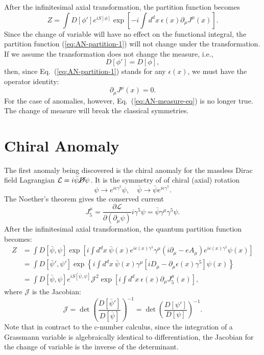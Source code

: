 After the infinitesimal axial transformation, the partition function becomes
\begin{equation}\label{eq:AN-partition-1}
	Z = \int D[\phi'] e^{iS[\phi]} \exp\left[-i\int d^d x \ \epsilon(x) \partial_\mu J^\mu (x)\right].
\end{equation}
Since the change of variable will have no effect on the functional integral, the partition function (\ref{eq:AN-partition-1}) will not change under the transformation.
If we assume the transformation does not change the measure, i.e.,
\begin{equation}\label{eq:AN-measure-eq}
	D[\phi'] = D[\phi],
\end{equation}
then, since Eq.~(\ref{eq:AN-partition-1}) stands for any $\epsilon(x)$, we must have the operator identity:
\begin{equation}
	\partial_\mu J^\mu(x) = 0.
\end{equation}
For the case of anomalies, however, Eq.~(\ref{eq:AN-measure-eq}) is no longer true.
The change of measure will break the classical symmetries.


\section{Chiral Anomaly}
The first anomaly being discovered is the chiral anomaly for the massless Dirac field Lagrangian $\mathcal L = i\bar\psi \cancel D \psi$.
It is the symmetry of of chiral (axial) rotation 
\begin{equation}
	\psi \rightarrow e^{i\epsilon \gamma^5}\psi, \quad
	\bar\psi \rightarrow \bar\psi e^{i\epsilon \gamma^5}.
\end{equation}
The Noether's theorem gives the conserved current
\begin{equation}
	J^\mu_5 = \frac{\partial \mathcal L}{\partial(\partial_\mu \psi)} i\gamma^5\psi = \bar\psi \gamma^\mu \gamma^5\psi.
\end{equation}
After the infinitesimal axial transformation, the quantum partition function becomes:
\begin{equation}\label{eq:AN-CH-partition}
\begin{aligned}
	Z &= \int D[\bar\psi,\psi] \exp\left[i\int d^d x\ \bar\psi(x) e^{i\epsilon(x)\gamma^5}\gamma^\mu(i\partial_\mu - e A_\mu) e^{i\epsilon(x)\gamma^5}\psi(x) \right] \\
	&= \int D[\bar\psi',\psi'] \exp\left\{i\int d^d x\ \bar\psi(x) \gamma^\mu\left[iD_\mu-\partial_\mu\epsilon(x)\gamma^5\right] \psi(x) \right\} \\
	&= \int D[\bar\psi,\psi] e^{iS[\bar\psi,\psi]} \mathcal J^2 \exp\left[i \int d^d x\ \epsilon(x) \partial_\mu J_5^\mu(x) \right],
\end{aligned}
\end{equation}
where $\mathcal J$ is the Jacobian:
\begin{equation}
	\mathcal J = \det\left(\frac{D[\bar\psi']}{D[\bar\psi]}\right)^{-1}=\det\left(\frac{D[\psi']}{D[\psi]}\right)^{-1}.
\end{equation}
Note that in contract to the c-number calculus, since the integration of a Grassmann variable is algebraically identical to differentiation, the Jacobian for the change of variable is the inverse of the determinant.


